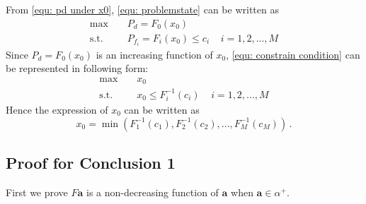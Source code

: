 \documentclass[12pt,journal,a4paper,twoside,onecolumn]{IEEEtran}
\begin{document}
\begin{spacing}{2.5}
From \eqref{equ: pd under x0}, \eqref{equ: problemstate} can be written as 
\begin{equation}
\begin{split}
\label{equ: constrain condition}
\max\;\;\;\; &P_d = F_0(x_0)\\
\text{s.t.}\;\;\;\;&P_{f_i} =  F_i(x_0) \leq c_i\;\;\;\;i = 1, 2, ..., M
\end{split}
\end{equation}
Since $P_d = F_0(x_0)$ is an increasing function of $x_0$, \eqref{equ: constrain condition} can be represented in following form:
\begin{equation}
\begin{split}
\label{equ: final constrain}
\max\;\;\;\; &x_0\\
\text{s.t.}\;\;\;\;&x_0 \leq F_i^{-1}(c_i)\;\;\;\;i = 1, 2, ..., M
\end{split}
\end{equation}
Hence the expression of $x_0$ can be written as
\begin{equation}
x_0 = \min(F_1^{-1}(c_1), F_2^{-1}(c_2), ..., F_M^{-1}(c_M))\,.
\end{equation}

\subsection{Proof for Conclusion 1}

First we prove $F\mathbf{a}$ is a non-decreasing function of $\mathbf{a}$ when $\mathbf{a} \in \alpha^+$.


\end{spacing}
\end{document}
